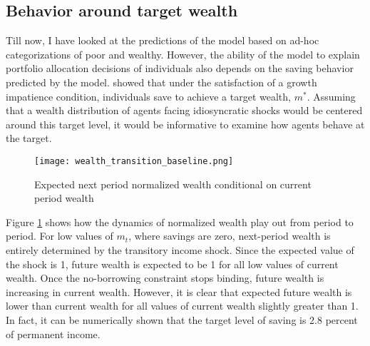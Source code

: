 \subsection{Behavior around target wealth}\label{target_wealth}

Till now, I have looked at the predictions of the model based on ad-hoc categorizations of poor and wealthy. However, the ability of the model to explain portfolio allocation decisions of individuals also depends on the saving behavior predicted by the model. \citet{Deaton1991} showed that under the satisfaction of a growth impatience condition, individuals save to achieve a target wealth, $m^*$. Assuming that a wealth distribution of agents facing idiosyncratic shocks would be centered around this target level, it would be informative to examine how agents behave at the target.
\begin{figure}[h]
    \centering
    \texttt{[image: wealth\_transition\_baseline.png]}
    \caption{Expected next period normalized wealth conditional on current period wealth}
    \label{fig:wealth_transition}
\end{figure}
Figure \ref{fig:wealth_transition} shows how the dynamics of normalized wealth play out from period to period. For low values of $m_{t}$, where savings are zero, next-period wealth is entirely determined by the transitory income shock. Since the expected value of the shock is 1, future wealth is expected to be 1 for all low values of current wealth. Once the no-borrowing constraint stops binding, future wealth is increasing in current wealth. However, it is clear that expected future wealth is lower than current wealth for all values of current wealth slightly greater than 1. In fact, it can be numerically shown that the target level of saving is 2.8 percent of permanent income.

